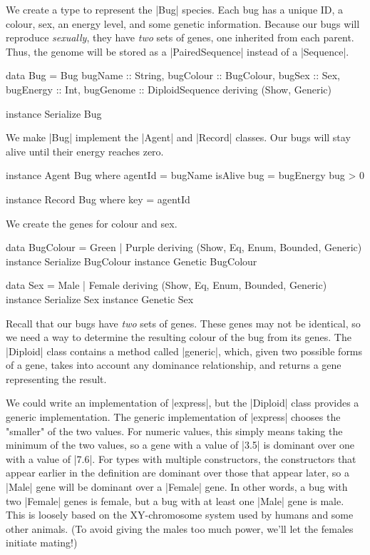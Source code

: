 We create a type to represent the |Bug| species.
Each bug has a unique ID, a colour, sex, an energy level,
and some genetic information.
Because our bugs will reproduce \emph{sexually}, they have \emph{two} sets of genes, 
one inherited from each parent.
Thus, the genome will be stored as
a |PairedSequence| instead of a |Sequence|.

\begin{code}
data Bug = Bug
  { 
    bugName :: String,
    bugColour :: BugColour,
    bugSex :: Sex,
    bugEnergy :: Int,
    bugGenome :: DiploidSequence
  } deriving (Show, Generic)

instance Serialize Bug
\end{code} 

We make |Bug| implement the |Agent| 
and |Record| classes.
Our bugs will stay alive until their energy reaches zero.

\begin{code}
instance Agent Bug where
  agentId = bugName
  isAlive bug = bugEnergy bug > 0

instance Record Bug where key = agentId
\end{code} 

We create the genes for colour and sex.

\begin{code}
data BugColour = Green | Purple
  deriving (Show, Eq, Enum, Bounded, Generic)
instance Serialize BugColour
instance Genetic BugColour

data Sex = Male | Female
  deriving (Show, Eq, Enum, Bounded, Generic)
instance Serialize Sex
instance Genetic Sex
\end{code} 

Recall that our bugs have \emph{two} sets of genes.
These genes may not be identical,
so we need a way to determine the resulting colour of the bug
from its genes.
The |Diploid| class contains a method called |generic|, which, 
given two possible forms of a gene, takes into account any dominance relationship,
and returns a gene representing the result.

We could write an implementation of |express|,
but the |Diploid| class provides a generic implementation.
The generic implementation of |express| chooses the "smaller" of the two values.
For numeric values, this simply means taking the minimum of the two values,
so a gene with a value of |3.5| is dominant over one with a value of |7.6|.
For types with multiple constructors, the constructors that appear
earlier in the definition are dominant over those that appear later,
so a |Male| gene will be dominant over a |Female| gene.
In other words, a bug with two |Female| genes is female, but a bug with at least one 
|Male| gene is male.
This is loosely based on the XY-chromosome system used by
humans and some other animals.
(To avoid giving the males too much power, we'll let the females initiate mating!)


